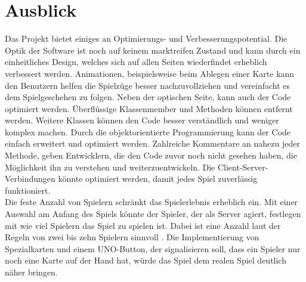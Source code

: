 \chapter{Ausblick}
Das Projekt bietet einiges an Optimierungs- und Verbesserungspotential. Die Optik der Software ist noch auf keinem marktreifen Zustand und kann durch ein einheitliches Design, welches sich auf allen Seiten wiederfindet erheblich verbessert werden. Animationen, beispielsweise beim Ablegen einer Karte kann den Benutzern helfen die Spielzüge besser nachzuvollziehen und vereinfacht es dem Spielgeschehen zu folgen. Neben der optischen Seite, kann auch der Code optimiert werden. Überflüssige Klassenmember und Methoden können entfernt werden. Weitere Klassen können den Code besser verständlich und weniger komplex machen. Durch die objektorientierte Programmierung kann der Code einfach erweitert und optimiert werden. Zahlreiche Kommentare an nahezu jeder Methode, geben Entwicklern, die den Code zuvor noch nicht gesehen haben, die Möglichkeit ihn zu verstehen und weiterzuentwickeln. Die Client-Server-Verbindungen könnte optimiert werden, damit jedes Spiel zuverlässig funktioniert.\\
Die feste Anzahl von Spielern schränkt das Spielerlebnis erheblich ein. Mit einer Auswahl am Anfang des Spiels könnte der Spieler, der als Server agiert, festlegen mit wie viel Spielern das Spiel zu spielen ist. Dabei ist eine Anzahl laut der Regeln von zwei bis zehn Spielern sinnvoll \cite{Mattel}. Die Implementierung von Spezialkarten und einem UNO-Button, der signalisieren soll, dass ein Spieler nur noch eine Karte auf der Hand hat, würde das Spiel dem realen Spiel deutlich näher bringen. 